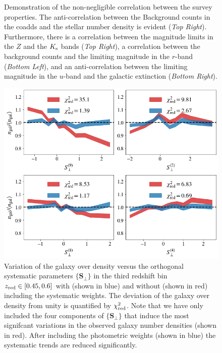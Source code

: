 \documentclass[fleqn,usenatbib,useAMS]{mnras}
\begin{document}
\begin{figure}
\begin{tabular}{cc}
\end{tabular}
\caption{\label{fig:sys_sys_correlation} Demonstration of the non-negligible correlation between the survey properties. The anti-correlation between the Background counts in the coadds and the stellar number density is evident (\textit{Top Right}). Furthermore, there is a correlation between the magnitude limits in the $Z$ and the $K_{\rm s}$ bands (\textit{Top Right}), a correlation between the background counts and the limiting magnitude in the $r$-band (\textit{Bottom Left}), and an anti-correlation between the limiting magnitude in the $u$-band and the galactic extinction (\textit{Bottom Right}).} 
\end{figure}

\begin{figure}
    \includegraphics[width = \textwidth]{figures_tmp/weights_2.png}
    \caption{Variation of the galaxy over density versus the orthogonal systematic parameters $\{\mathbf{S}_{\perp}\}$ in the third redshift bin $z_{\rm red} \in [0.45, 0.6]$ with (shown in blue) and without (shown in red) including the systematic weights. The deviation of the galaxy over density from unity is quantified by $\chi^{2}_{\rm red}$. Note that we have only included the four components of $\{\mathbf{S}_{\perp}\}$ that induce the most signifcant variations in the observed galaxy number densities (shown in red). After including the photometric weights (shown in blue) the systematic trends are reduced significantly.}
    \label{fig:sys_ng_correlation}
\end{figure}
\end{document}
